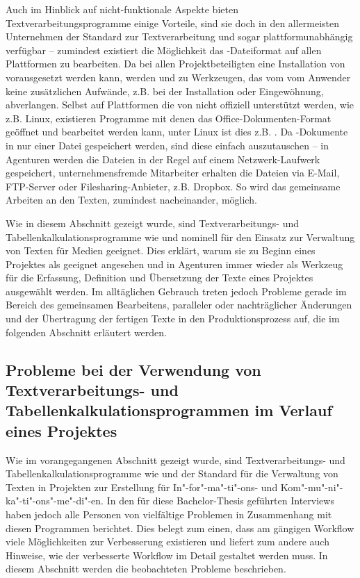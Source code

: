 Auch im Hinblick auf nicht-funktionale Aspekte bieten Textverarbeitungsprogramme einige Vorteile, sind sie doch in den allermeisten Unternehmen der Standard zur Textverarbeitung und sogar plattformunabhängig verfügbar -- zumindest existiert die Möglichkeit das -Dateiformat auf allen Plattformen zu bearbeiten. Da bei allen Projektbeteiligten eine Installation von  vorausgesetzt werden kann, werden  und  zu  Werkzeugen, das vom vom Anwender keine zusätzlichen Aufwände, z.B. bei der Installation oder Eingewöhnung, abverlangen. Selbst auf Plattformen die von  nicht offiziell unterstützt werden, wie z.B. Linux, existieren Programme mit denen das Office-Dokumenten-Format geöffnet und bearbeitet werden kann, unter Linux ist dies z.B. . Da -Dokumente in nur einer Datei gespeichert werden, sind diese einfach auszutauschen -- in Agenturen werden die Dateien in der Regel auf einem Netzwerk-Laufwerk gespeichert, unternehmensfremde Mitarbeiter erhalten die Dateien via E-Mail, FTP-Server oder Filesharing-Anbieter, z.B. Dropbox. So wird das gemeinsame Arbeiten an den Texten, zumindest nacheinander, möglich. 

\bigskip

Wie in diesem Abschnitt gezeigt wurde, sind Textverarbeitungs- und Tabellenkalkulationsprogramme wie   und  nominell für den Einsatz zur Verwaltung von Texten für Medien geeignet. Dies erklärt, warum sie zu Beginn eines Projektes als geeignet angesehen und in Agenturen immer wieder als Werkzeug für die Erfassung, Definition und Übersetzung der Texte eines Projektes ausgewählt werden. Im alltäglichen Gebrauch treten jedoch Probleme gerade im Bereich des gemeinsamen Bearbeitens, paralleler oder nachträglicher Änderungen und der Übertragung der fertigen Texte in den Produktionsprozess auf, die im folgenden Abschnitt erläutert werden.

\subsection{Probleme bei der Verwendung von Textverarbeitungs- und Tabellenkalkulationsprogrammen im Verlauf eines Projektes}
\label{l:officeprobleme}

Wie im vorangegangenen Abschnitt gezeigt wurde, sind Textverarbeitungs- und Tabellenkalkulationsprogramme wie   und  der Standard für die Verwaltung von Texten in Projekten zur Erstellung für In"-for"-ma"-ti"-ons- und Kom"-mu"-ni"-ka"-ti"-ons"-me"-di"-en. In den für diese Bachelor-Thesis geführten Interviews haben jedoch alle Personen von vielfältige Problemen in Zusammenhang mit diesen Programmen berichtet. Dies belegt zum einen, dass am gängigen Workflow viele Möglichkeiten zur Verbesserung existieren und liefert zum andere auch Hinweise, wie der verbesserte Workflow im Detail gestaltet werden muss. In diesem Abschnitt werden die beobachteten Probleme beschrieben.

